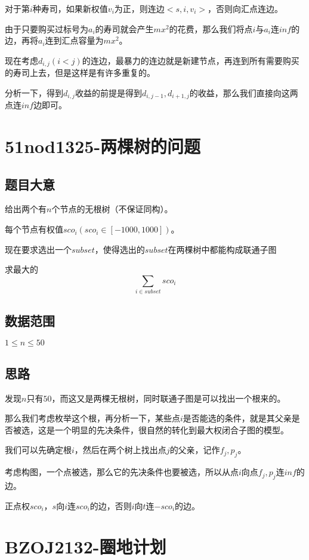 \documentclass{ctexart}
\numberwithin{equation}{section}
\begin{document}
\begin{flushleft}
  对于第$i$种寿司，如果新权值$v_i$为正，则连边$<s,i,v_i>$，否则向汇点连边。

  由于只要购买过标号为$a_i$的寿司就会产生$mx^2$的花费，那么我们将点$i$与$a_i$连$inf$的边，再将$a_i$连到汇点容量为$mx^2$。

  现在考虑$d_{i,j}(i<j)$的连边，最暴力的连边就是新建节点，再连到所有需要购买的寿司上去，但是这样是有许多重复的。

  分析一下，得到$d_{i,j}$收益的前提是得到$d_{i,j-1},d_{i+1,j}$的收益，那么我们直接向这两点连$inf$边即可。

  \newpage

  \section{51nod1325-两棵树的问题}
  \subsection{题目大意}
  给出两个有$n$个节点的无根树（不保证同构）。

  每个节点有权值$sco_i(sco_i\in[-1000,1000])$。

  现在要求选出一个$subset$，使得选出的$subset$在两棵树中都能构成联通子图

  求最大的$$\sum_{i\in subset}sco_i$$
  
  \subsection{数据范围}
  $1\le n \le 50$
  
  \subsection{思路}
  发现$n$只有$50$，而这又是两棵无根树，同时联通子图是可以找出一个根来的。

  那么我们考虑枚举这个根，再分析一下，某些点$i$是否能选的条件，就是其父亲是否被选，这是一个明显的先决条件，很自然的转化到最大权闭合子图的模型。

  我们可以先确定根$i$，然后在两个树上找出点$j$的父亲，记作$f_j,p_j$。

  考虑构图，一个点被选，那么它的先决条件也要被选，所以从点$i$向点$f_j,p_j$连$inf$的边。

  正点权$sco_i$，$s$向$i$连$sco_i$的边，否则$i$向$t$连$-sco_i$的边。

  \newpage

  \section{BZOJ2132-圈地计划}

\end{flushleft}
\end{document}
